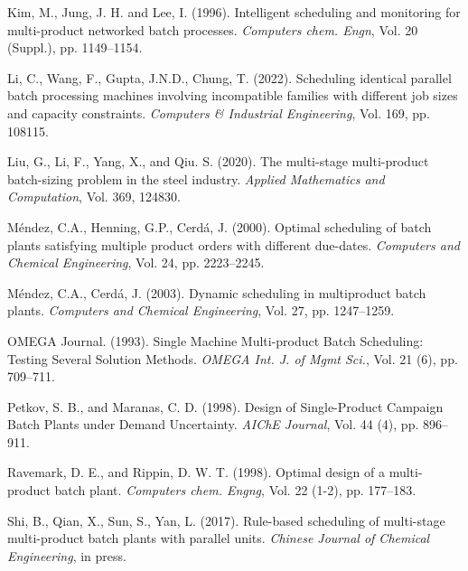 \documentclass[authoryear,manuscript,12pt]{elsarticle}
\begin{document}
\begin{thebibliography}{1}
Kim, M., Jung, J. H. and Lee, I. (1996). Intelligent scheduling and monitoring for multi-product networked batch processes. {\it  Computers chem. Engn}, Vol. 20 (Suppl.), pp. 1149--1154.

Li, C., Wang, F., Gupta, J.N.D., Chung, T. (2022). Scheduling identical parallel batch processing machines involving incompatible families with different job sizes and capacity constraints. {\it Computers \& Industrial Engineering}, Vol. 169, pp. 108115.

Liu, G., Li, F., Yang, X., and Qiu. S. (2020). The multi-stage multi-product batch-sizing problem in the steel industry. {\it  Applied Mathematics and Computation}, Vol. 369, 124830.

Méndez, C.A., Henning, G.P., Cerdá, J. (2000). Optimal scheduling of batch plants satisfying multiple product
orders with different due-dates. {\it Computers and Chemical Engineering}, Vol. 24, pp. 2223--2245.

Méndez, C.A., Cerdá, J. (2003). Dynamic scheduling in multiproduct batch plants. {\it Computers and Chemical Engineering}, Vol. 27, pp. 1247--1259.

OMEGA Journal. (1993). Single Machine Multi-product Batch Scheduling: Testing Several Solution Methods. {\it  OMEGA Int. J. of Mgmt Sci.}, Vol. 21 (6), pp. 709--711.

Petkov, S. B., and Maranas, C. D. (1998). Design of Single-Product Campaign Batch Plants under Demand Uncertainty. {\it  AIChE Journal}, Vol. 44 (4), pp. 896--911.

Ravemark, D. E., and Rippin, D. W. T. (1998). Optimal design of a multi-product batch plant. {\it Computers chem. Engng}, Vol. 22 (1-2), pp. 177--183.

Shi, B., Qian, X., Sun, S., Yan, L. (2017). Rule-based scheduling of multi-stage multi-product batch plants with parallel units. {\it Chinese Journal of Chemical Engineering}, in press.

\end{thebibliography}
\end{document}
